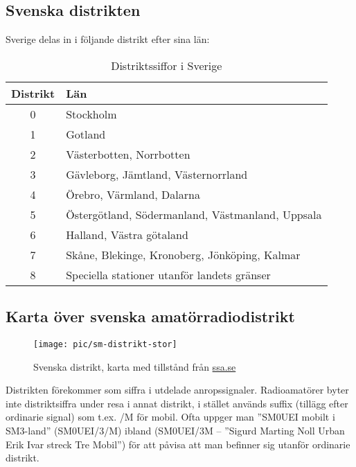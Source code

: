\subsection{Svenska distrikten}

Sverige delas in i följande distrikt efter sina län:

\begin{table}[h]
	\centering
\begin{tabular}{cl}
	\textbf{Distrikt} & \textbf{Län}                                     \\ \hline %
	      0           & Stockholm                                        \\
	      1           & Gotland                                          \\
	      2           & Västerbotten, Norrbotten                         \\
	      3           & Gävleborg, Jämtland, Västernorrland              \\
	      4           & Örebro, Värmland, Dalarna                        \\
	      5           & Östergötland, Södermanland, Västmanland, Uppsala \\
	      6           & Halland, Västra götaland                         \\
	      7           & Skåne, Blekinge, Kronoberg, Jönköping, Kalmar    \\
	      8           & Speciella stationer utanför landets gränser
\end{tabular}
\caption{Distriktssiffor i Sverige}
\end{table}

\subsection{Karta över svenska amatörradiodistrikt}

\begin{figure}
	\centering
	\texttt{[image: pic/sm-distrikt-stor]}
	\label{fig:sm-distrikt}
	\caption{Svenska distrikt, karta med tillstånd från
          \href{https://SSA.SE}{ssa.se}}
\end{figure}

Distrikten förekommer som siffra i utdelade anropssignaler. Radioamatörer
byter inte distriktsiffra under resa i annat distrikt, i stället används
suffix (tillägg efter ordinarie signal) som t.ex. /M för mobil. Ofta uppger
man ''SM0UEI mobilt i SM3-land'' (SM0UEI/3/M) ibland (SM0UEI/3M -- ''Sigurd
Marting Noll Urban Erik Ivar streck Tre Mobil'') för att påvisa att man
befinner sig utanför ordinarie distrikt.

